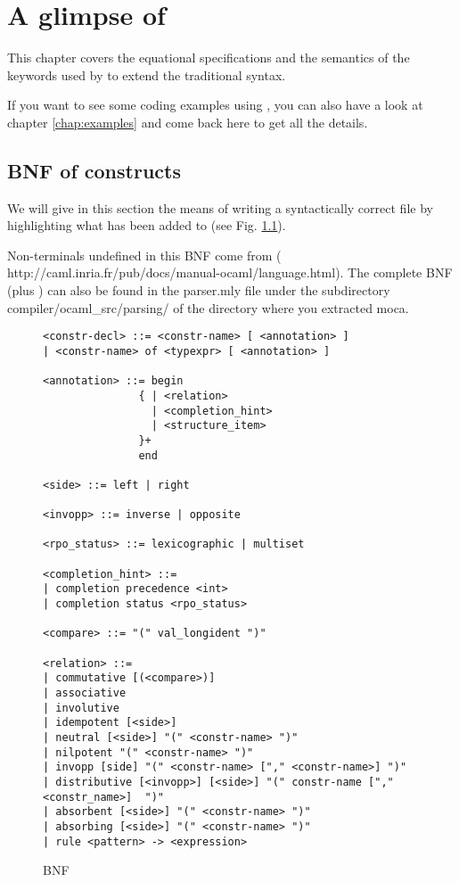 
\chapter{A glimpse of \moca}
\label{chap:keywords}

This chapter covers the equational specifications and the semantics of
the keywords used by \moca to extend the traditional \ocaml syntax.

If you want to see some coding examples using \moca, you can also
have a look at chapter \ref{chap:examples} and come back here to get all
the details.

\section{BNF of \moca constructs}
\label{sec:bnf}

We will give in this section the means of writing a syntactically correct \mlm file
by highlighting what has been added to \ocaml (see Fig. \ref{fig:bnf}).

Non-terminals undefined in this BNF come from \ocaml ({\sf
  http://caml.inria.fr/pub/docs/manual-ocaml/language.html}). The
complete BNF (\moca plus \ocaml) can also be found in the {\sf
  parser.mly} file under the subdirectory {\sf
  compiler/ocaml\_src/parsing/} of the directory where you extracted moca.  

\begin{figure}[!ht]
  \centering
\begin{verbatim}
<constr-decl> ::= <constr-name> [ <annotation> ]
| <constr-name> of <typexpr> [ <annotation> ]
 
<annotation> ::= begin
               { | <relation>
                 | <completion_hint>
                 | <structure_item>
               }+
               end

<side> ::= left | right

<invopp> ::= inverse | opposite

<rpo_status> ::= lexicographic | multiset

<completion_hint> ::=
| completion precedence <int>
| completion status <rpo_status> 

<compare> ::= "(" val_longident ")"

<relation> ::=
| commutative [(<compare>)]
| associative
| involutive
| idempotent [<side>]
| neutral [<side>] "(" <constr-name> ")"
| nilpotent "(" <constr-name> ")"
| invopp [side] "(" <constr-name> ["," <constr-name>] ")"
| distributive [<invopp>] [<side>] "(" constr-name ["," <constr_name>]  ")"
| absorbent [<side>] "(" <constr-name> ")"
| absorbing [<side>] "(" <constr-name> ")"
| rule <pattern> -> <expression>
\end{verbatim}
  
  \caption{\moca BNF}
  \label{fig:bnf}
\end{figure}

